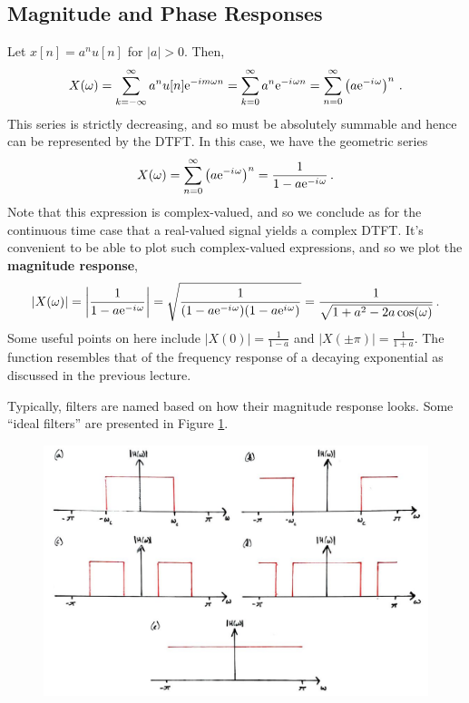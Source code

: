 \subsection{Magnitude and Phase Responses}
%
\begin{exmp}
  Let $x[n] = a^n u[n]$ for $|a|>0$. Then,
  \begin{displaymath}
    X(\omega) = \sum_{k=-\infty}^\infty a^n u[n]\mathrm{e}^{-im\omega n} = \sum_{k=0}^\infty a^n\mathrm{e}^{-{i\mkern1mu}\omega n}
    = \sum_{n=0}^\infty\left(a\mathrm{e}^{-{i\mkern1mu}\omega}\right)^n \,.
  \end{displaymath}
  This series is strictly decreasing, and so must be absolutely summable and
  hence can be represented by the DTFT. In this case, we have the geometric series
  \begin{displaymath}
    X(\omega) = \sum_{n=0}^\infty\left(a\mathrm{e}^{-{i\mkern1mu}\omega}\right)^n = \frac{1}{1-a\mathrm{e}^{-{i\mkern1mu}\omega}} \,.
  \end{displaymath}
  Note that this expression is complex-valued, and so we conclude as for the continuous
  time case that a real-valued signal yields a complex DTFT. It's convenient to be
  able to plot such complex-valued expressions, and so we plot the
  \textbf{magnitude response},
  \begin{displaymath}
    |X(\omega)| = \left|\frac{1}{1-a\mathrm{e}^{-{i\mkern1mu}\omega}}\right|
    = \sqrt{\frac{1}{(1-a\mathrm{e}^{-{i\mkern1mu}\omega})(1-a\mathrm{e}^{{i\mkern1mu}\omega})}}
    = \frac{1}{\sqrt{1 + a^2 - 2a\cos(\omega)}} \,.
  \end{displaymath}
  Some useful points on here include $|X(0)| = \frac{1}{1-a}$ and 
  $|X(\pm\pi)| = \frac{1}{1+a}$. The function resembles that of the frequency
  response of a decaying exponential as discussed in the previous lecture.
\end{exmp}
%
Typically, filters are named based on how their magnitude response looks. Some
``ideal filters'' are presented in Figure \ref{fig::lecture_7_ideal_filters}.
%
\begin{figure}[!htb]
  \includegraphics[width=\textwidth]{images/lecture_7_ideal_filters.JPG}
  \caption{
  }
  \label{fig::lecture_7_ideal_filters}
\end{figure}
